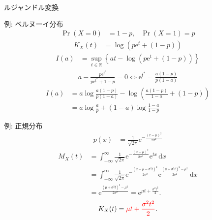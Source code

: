 \documentclass[lualatex,handout]{beamer}
\newcommand{\emm}[1]{\textcolor{red}{#1}}
\newcommand{\expt}[1]{\mathbb{E}\left[#1\right]}
\newcommand\dx{{\,\mathrm{d}x}}
\theoremstyle{definition}
\begin{document}
\begin{frame}{ルジャンドル変換}
\centering
{}
\end{frame}

\begin{frame}{例: ベルヌーイ分布}
\begin{align*}
\Pr(X=0) &= 1-p,&\Pr(X=1)=p
\end{align*}
\begin{align*}
K_X(t) &= \log(p\mathrm{e}^t + (1-p))
\end{align*}
\begin{align*}
I(a) &= \sup_{t\in\mathbb{R}} \left\{ at - \log(p\mathrm{e}^t+(1-p))\right\}
\end{align*}
\begin{align*}
a - \frac{p\mathrm{e}^{t^*}}{p\mathrm{e}^{t^*}+1-p} = 0
\iff \mathrm{e}^{t^*} = \frac{a(1-p)}{p(1-a)}
\end{align*}
\begin{align*}
I(a) &= a\log\frac{a(1-p)}{p(1-a)} - \log\left(\frac{a(1-p)}{1-a} + (1-p)\right)\\
 &= a\log\frac{a}{p} + (1-a)\log\frac{1-a}{1-p}
\end{align*}
\end{frame}

\begin{frame}{例: 正規分布}
\begin{align*}
p(x) &= \frac1{\sqrt{2\pi}} \mathrm{e}^{-\frac{(x-\mu)^2}{2\sigma^2}}
\end{align*}
\begin{align*}
M_X(t) &= \int_{-\infty}^\infty\frac1{\sqrt{2\pi}} \mathrm{e}^{-\frac{(x-\mu)^2}{2\sigma^2}} \mathrm{e}^{tx}\dx\\
 &= \int_{-\infty}^\infty\frac1{\sqrt{2\pi}} \mathrm{e}^{-\frac{(x-\mu -\sigma^2t)^2}{2\sigma^2}} \mathrm{e}^{\frac{(\mu+\sigma^2t)^2-\mu^2}{2\sigma^2}}\dx\\
&=\mathrm{e}^{\frac{(\mu+\sigma^2t)^2-\mu^2}{2\sigma^2}}
=\mathrm{e}^{\mu t + \frac{\sigma^2t^2}2}.
\end{align*}
\begin{align*}
K_X(t) &= \emm{\mu t + \frac{\sigma^2t^2}2}.\\
\end{align*}
\end{frame}
\end{document}
